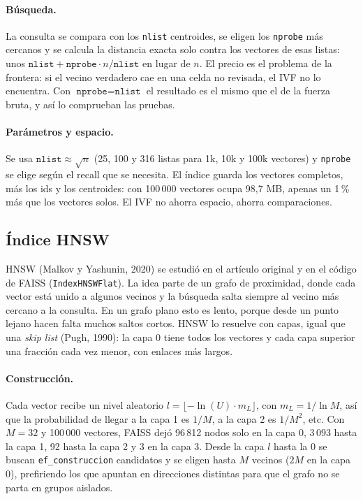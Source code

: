 \documentclass[11pt,a4paper]{article}
\begin{document}
\paragraph{Búsqueda.} La consulta se compara con los \texttt{nlist} centroides, se eligen los \texttt{nprobe} más cercanos y se calcula la distancia exacta solo contra los vectores de esas listas: unos $\texttt{nlist} + \texttt{nprobe} \cdot n / \texttt{nlist}$ en lugar de $n$. El precio es el problema de la frontera: si el vecino verdadero cae en una celda no revisada, el IVF no lo encuentra. Con $\texttt{nprobe} = \texttt{nlist}$ el resultado es el mismo que el de la fuerza bruta, y así lo comprueban las pruebas.

\paragraph{Parámetros y espacio.} Se usa $\texttt{nlist} \approx \sqrt{n}$ (25, 100 y 316 listas para 1k, 10k y 100k vectores) y \texttt{nprobe} se elige según el recall que se necesita. El índice guarda los vectores completos, más los ids y los centroides: con 100\,000 vectores ocupa 98,7 MB, apenas un 1\,\% más que los vectores solos. El IVF no ahorra espacio, ahorra comparaciones.

\subsection{Índice HNSW}

HNSW (Malkov y Yashunin, 2020) se estudió en el artículo original y en el código de FAISS (\texttt{IndexHNSWFlat}). La idea parte de un grafo de proximidad, donde cada vector está unido a algunos vecinos y la búsqueda salta siempre al vecino más cercano a la consulta. En un grafo plano esto es lento, porque desde un punto lejano hacen falta muchos saltos cortos. HNSW lo resuelve con capas, igual que una \emph{skip list} (Pugh, 1990): la capa 0 tiene todos los vectores y cada capa superior una fracción cada vez menor, con enlaces más largos.

\paragraph{Construcción.} Cada vector recibe un nivel aleatorio $l = \lfloor -\ln(U) \cdot m_L \rfloor$, con $m_L = 1 / \ln M$, así que la probabilidad de llegar a la capa 1 es $1/M$, a la capa 2 es $1/M^2$, etc. Con $M = 32$ y 100\,000 vectores, FAISS dejó 96\,812 nodos solo en la capa 0, 3\,093 hasta la capa 1, 92 hasta la capa 2 y 3 en la capa 3. Desde la capa $l$ hasta la 0 se buscan \texttt{ef\_construccion} candidatos y se eligen hasta $M$ vecinos ($2M$ en la capa 0), prefiriendo los que apuntan en direcciones distintas para que el grafo no se parta en grupos aislados.
\end{document}
